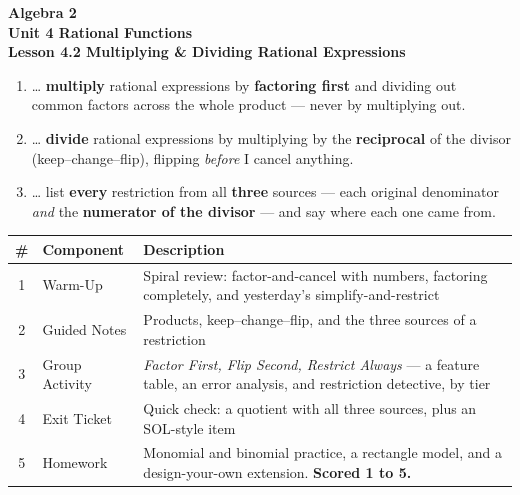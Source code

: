 \documentclass[10pt]{article}
\begin{document}
\vspace{-0.8in}

\begin{center}
  {\color{white}\textbf{\LARGE Algebra 2}}\\[4pt]
  {\color{forestmid}\large\textbf{Unit 4 \quad Rational Functions}}\\[6pt]
  {\color{white}\textbf{\large Lesson 4.2 \quad Multiplying \& Dividing Rational Expressions}}
\end{center}

\vspace{0.22in}
\namedateperiod
\vspace{0.18in}

\begin{learningtargetbox}
\small
\begin{enumerate}[leftmargin=1.5em, itemsep=5pt]
  \item \ldots{} \textbf{multiply} rational expressions by \textbf{factoring first} and dividing out common factors across the whole product --- never by multiplying out.
  \item \ldots{} \textbf{divide} rational expressions by multiplying by the \textbf{reciprocal} of the divisor (keep--change--flip), flipping \emph{before} I cancel anything.
  \item \ldots{} list \textbf{every} restriction from all \textbf{three} sources --- each original denominator \emph{and} the \textbf{numerator of the divisor} --- and say where each one came from.
\end{enumerate}
\end{learningtargetbox}

\vspace{0.14in}

\begin{tocbox}
\small
\renewcommand{\arraystretch}{1.5}
\begin{tabularx}{\linewidth}{@{} c l X @{}}
\rowcolor{forestbg}
\textbf{\#} & \textbf{Component} & \textbf{Description} \\
\midrule
1 & Warm-Up        & Spiral review: factor-and-cancel with numbers, factoring completely, and yesterday's simplify-and-restrict \\
2 & Guided Notes   & Products, keep--change--flip, and the three sources of a restriction \\
3 & Group Activity & \emph{Factor First, Flip Second, Restrict Always} --- a feature table, an error analysis, and restriction detective, by tier \\
4 & Exit Ticket    & Quick check: a quotient with all three sources, plus an SOL-style item \\
5 & Homework       & Monomial and binomial practice, a rectangle model, and a design-your-own extension. \textbf{Scored 1 to 5.} \\
\end{tabularx}
\end{tocbox}
\end{document}
